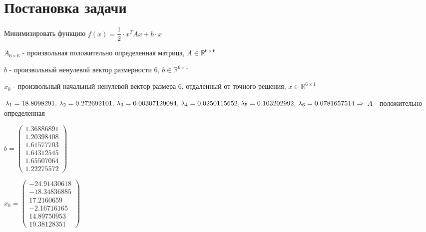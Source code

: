 \documentclass[a4paper, 14pt]{extarticle}
\begin{document}
	\pagebreak	

	\section{Постановка задачи}
		Минимизировать функцию $ f(x) = \dfrac{1}{2} \cdot x^TAx + b \cdot x$
		
		$A_{6\times6}$ - произвольная положительно определенная матрица, $A \in \mathbb{R}^{6\times6}$
		
		$b$	- произвольный ненулевой вектор размерности 6, $b \in \mathbb{R}^{6\times1}$ 
		
		$x_0$ - произвольный начальный ненулевой вектор размера 6, отдаленный от точного решения, $ x \in \mathbb{R}^{6\times1} $
		
		
		$ \lambda_1 = 18.8098291,\, \lambda_2 = 0.272692101,\, \lambda_3 = 0.00307129084,\, \lambda_4 = 0.0250115652,\,\\ \lambda_5 = 0.103202992,\, \lambda_6 = 0.0781657514 \Rightarrow $ $A$ - положительно определенная
		
		$b = \begin{pmatrix} 
				1.36886891\\
				1.20398408\\
				1.61577703\\
				1.64312545\\
				1.65507064\\
				1.22275572
			\end{pmatrix}  $
		
		$x_0 = \begin{pmatrix} 
			-24.91430618\\
			-18.34836885\\
			 17.2160659\\
			 -2.16716165\\
			 14.89750953\\
			 19.38128351
		\end{pmatrix}  $		
	
\end{document}
